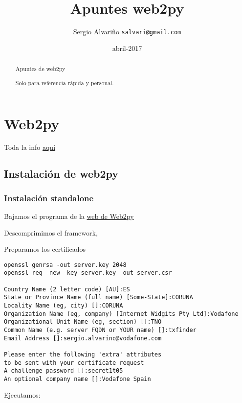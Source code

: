 \documentclass[12pt,spanish,]{article}
\title{Apuntes web2py}
\author{Sergio Alvariño
\href{mailto:salvari@gmail.com}{\nolinkurl{salvari@gmail.com}}}
\date{abril-2017}
\begin{document}
\maketitle
\begin{abstract}
Apuntes de web2py

Solo para referencia rápida y personal.
\end{abstract}

{
\hypersetup{linkcolor=}
\setcounter{tocdepth}{3}
\tableofcontents
}
\hypertarget{web2py}{%
\section{Web2py}\label{web2py}}

Toda la info \href{http://web2py.com}{aquí}

\hypertarget{instalaciuxf3n-de-web2py}{%
\subsection{Instalación de web2py}\label{instalaciuxf3n-de-web2py}}

\hypertarget{instalaciuxf3n-standalone}{%
\subsubsection{Instalación standalone}\label{instalaciuxf3n-standalone}}

Bajamos el programa de la
\href{http://www.web2py.com/init/default/download}{web de Web2py}

Descomprimimos el framework,

Preparamos los certificados

\begin{verbatim}
openssl genrsa -out server.key 2048
openssl req -new -key server.key -out server.csr

Country Name (2 letter code) [AU]:ES
State or Province Name (full name) [Some-State]:CORUNA
Locality Name (eg, city) []:CORUNA
Organization Name (eg, company) [Internet Widgits Pty Ltd]:Vodafone
Organizational Unit Name (eg, section) []:TNO
Common Name (e.g. server FQDN or YOUR name) []:txfinder
Email Address []:sergio.alvarino@vodafone.com

Please enter the following 'extra' attributes
to be sent with your certificate request
A challenge password []:secret1t05
An optional company name []:Vodafone Spain
\end{verbatim}

Ejecutamos:
\end{document}
